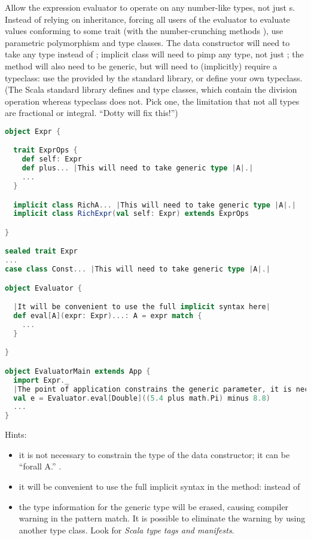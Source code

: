 \documentclass[10 pt]{article}
\begin{document}
\begin{example}
Allow the expression evaluator to operate on any number-like types, not just s. Instead of relying on inheritance, forcing all users of the evaluator to evaluate values conforming to some trait (with the number-crunching methods \pcode{+, -, *, /}), use parametric polymorphism and type classes. The  data constructor will need to take any type instead of ;  implicit class will need to pimp any type, not just ; the  method will also need to be generic, but will need to (implicitly) require a typeclass: use the  provided by the standard library, or define your own  typeclass. (The Scala standard library defines  and  type classes, which contain the division operation whereas  typeclass does not. Pick one, the limitation that not all types are fractional or integral. ``Dotty will fix this!'')

\begin{lstlisting}[caption={Flexible evaluator with DSL and typeclasses}, label={code:eepm3}, language=Scala, escapechar=|]
object Expr {

  trait ExprOps {
    def self: Expr
    def plus... |This will need to take generic type |A|.|
    ...
  }

  implicit class RichA... |This will need to take generic type |A|.|
  implicit class RichExpr(val self: Expr) extends ExprOps

}

sealed trait Expr
...
case class Const... |This will need to take generic type |A|.|

object Evaluator {

  |It will be convenient to use the full implicit syntax here|
  def eval[A](expr: Expr)...: A = expr match {
    ...
  }

}

object EvaluatorMain extends App {
  import Expr._
  |The point of application constrains the generic parameter, it is necessary to specify the type |A|. in |eval|.|
  val e = Evaluator.eval[Double]((5.4 plus math.Pi) minus 8.8)
  ...
}
\end{lstlisting}

Hints: \begin{itemize}
  \item it is not necessary to constrain the type of the  data constructor; it can be ``forall A.'' .
  \item it will be convenient to use the full implicit syntax in the  method:  instead of 
  \item the type information for the generic type  will be erased, causing compiler warning in the pattern match. It is possible to eliminate the warning by using another type class. Look for \emph{Scala type tags and manifests}.
\end{itemize}

\end{example}
\end{document}
